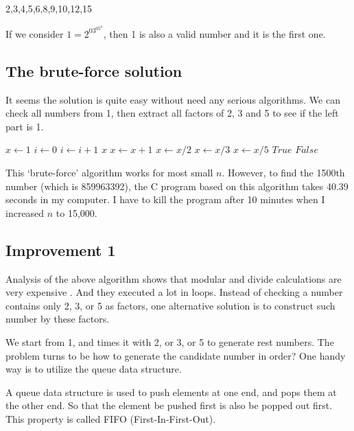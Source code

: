 \documentclass[UTF8]{article}
\begin{document}
2,3,4,5,6,8,9,10,12,15

If we consider $1=2^03^05^0$, then 1 is also a valid number and it is
the first one.

\subsection{The brute-force solution}
It seems the solution is quite easy without need any serious algorithms.
We can check all numbers from 1, then extract all factors of 2, 3 and 5
to see if the left part is 1.

\begin{algorithmic}[1]
  \State $x \gets 1$
  \State $i \gets 0$
  \Loop
      \State $i \gets i + 1$
        \State \Return $x$
      \EndIf
    \EndIf
    \State $x \gets x + 1$
  \EndLoop
\EndFunction
\Statex
{}
    \State $x \gets x / 2$
  \EndWhile
    \State $x \gets x / 3$
  \EndWhile
    \State $x \gets x / 5$
  \EndWhile
    \State \Return $True$
  \Else
    \State \Return $False$
  \EndIf
\EndFunction
\end{algorithmic}

This `brute-force' algorithm works for most small $n$. However, to find
the 1500th number (which is 859963392), the C program based on this
algorithm takes 40.39 seconds in my computer. I have to kill the program
after 10 minutes when I increased $n$ to 15,000.

\subsection{Improvement 1}
Analysis of the above algorithm shows that modular and divide calculations
are very expensive \cite{Bentley}. And they executed a lot in loops.
Instead of checking a number contains only 2, 3, or 5 as factors, one
alternative solution is to construct such number by these factors.

We start from 1, and times it with 2, or 3, or 5 to generate rest numbers.
The problem turns to be how to generate the candidate number in order?
One handy way is to utilize the queue data structure.

A queue data structure is used to push elements at one end, and pops
them at the other end. So that the element be pushed first is also
be popped out first. This property is called FIFO (First-In-First-Out).
\end{document}

